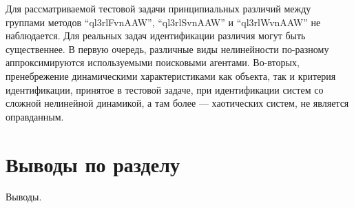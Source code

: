 Для рассматриваемой тестовой задачи принципиальных различий
между группами методов
``ql3rlFvnAAW'', ``ql3rlSvnAAW'' и ``ql3rlWvnAAW''
не наблюдается. Для реальных задач идентификации
различия могут быть существеннее.
В первую очередь, различные виды нелинейности
по-разному аппроксимируются используемыми поисковыми агентами.
Во-вторых, пренебрежение динамическими характеристиками
как объекта, так и критерия идентификации, принятое
в тестовой задаче, при идентификации систем со сложной нелинейной динамикой,
а там более --- хаотических систем, не является оправданным.







%
%
%
%
%
%
%
%
%







\section{Выводы по разделу \thechapter} %

Выводы.


%
%
%
%
%


